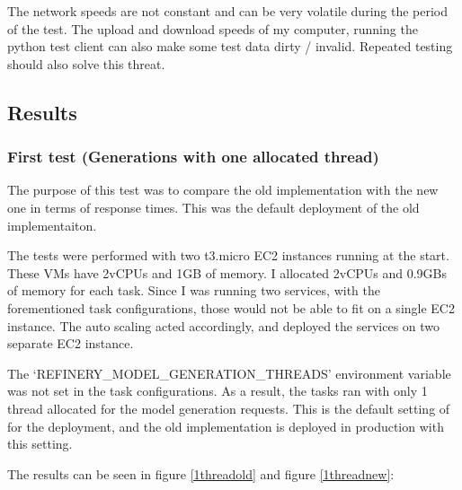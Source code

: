 			The network speeds are not constant and can be very volatile during the period of the test. The upload and download speeds of my computer, running the 
			python test client can also make some test data dirty / invalid.  Repeated testing should also solve this threat.

		\subsection{Results}
			\subsubsection{First test (Generations with one allocated thread)} \label{firsttest}
			The purpose of this test was to compare the old implementation with the new one in terms of response times. This was 
			the default deployment of the old implementaiton.

			The tests were performed with two t3.micro EC2 instances running at the start. These VMs have 2vCPUs and 1GB of memory. I allocated
			2vCPUs and 0.9GBs of memory for each task. Since I was running two services, with the forementioned task configurations, 
			those would not be able to fit on a single EC2 instance. The auto scaling acted accordingly, and deployed the services on two 
			separate EC2 instance. 

			The `REFINERY\_MODEL\_GENERATION\_THREADS' environment variable was not set in the task configurations. As a result, the tasks ran with only 1 thread
			allocated for the model generation requests.
			This is the default setting of for the deployment, and the old implementation is deployed in production with this setting.

			The results can be seen in figure \ref{1threadold} and figure \ref{1threadnew}:

